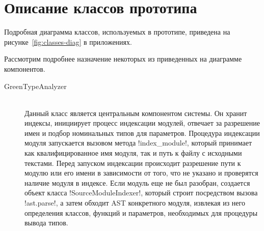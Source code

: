 \section{Описание классов прототипа}
\label{sec:classes-description}

Подробная диаграмма классов, используемых в прототипе, приведена на
 рисунке~\ref{fig:classes-diag} в приложениях.

Рассмотрим подробнее назначение некоторых из приведенных на диаграмме компонентов.

\begin{description}
  \item[GreenTypeAnalyzer] \hfill \\
    Данный класс является центральным компонентом системы. Он хранит индексы,
    инициирует процесс индексации модулей, отвечает за разрешение имен и подбор
    номинальных типов для параметров. Процедура индексации модуля запускается
    вызовом метода !index_module!, который принимает как квалифицированное имя
    модуля, так и путь к файлу с исходными текстами. Перед запуском индексации
    происходит разрешение пути к модулю или его имени в зависимости от того,
    что не указано и проверятся наличие модуля в индексе. Если модуль еще не
    был разобран, создается объект класса !SourceModuleIndexer!, который
    строит посредством вызова !ast.parse!, а затем обходит AST конкретного
    модуля, извлекая из него определения классов, функций и параметров,
    необходимых для процедуры вывода типов.


\end{description}
